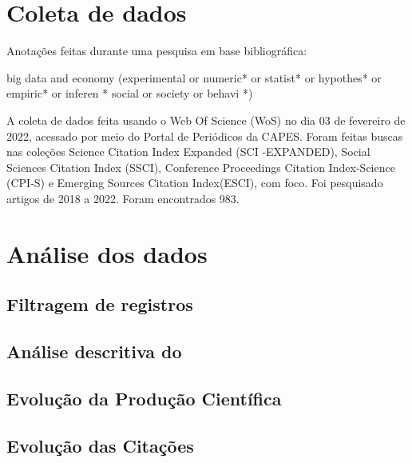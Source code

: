 \section{Coleta de dados}

Anotações feitas durante uma pesquisa em base bibliográfica:

big data and economy (experimental  or  numeric* or  statist* or  hypothes* or  empiric* or  inferen * social  or  society  or  behavi *)

A coleta de dados feita usando o Web Of Science (WoS) no dia 03 de fevereiro de 2022, acessado por meio do Portal de Periódicos da CAPES. Foram feitas buscas nas coleções Science  Citation  Index  Expanded (SCI -EXPANDED), Social Sciences  Citation  Index (SSCI), Conference Proceedings Citation Index-Science (CPI-S) e Emerging Sources Citation Index(ESCI), com foco.
Foi pesquisado artigos de 2018 a 2022.
Foram encontrados 983.

\section{Análise dos dados}

\subsection{Filtragem de registros}

\subsection{Análise descritiva do }



\subsection{Evolução da Produção Científica}




\subsection{Evolução das Citações}
